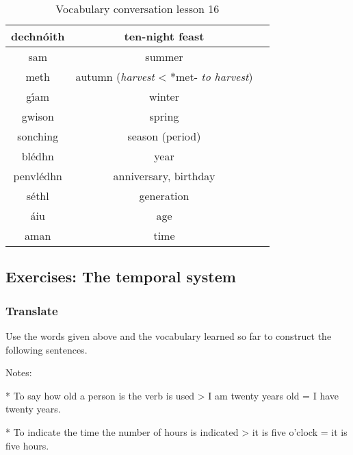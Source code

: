 \begin{table}[H]
\begin{tabular}{ccc}
  dechn\'{o}ith & ten-night feast & \\
  \midrule
  sam & summer & \\
  meth & autumn (\textit{harvest} < *met- \textit{to harvest})\\
  g\'{\i}am & winter & \\
  gwison & spring & \\
  \midrule
  sonching & season (period) & \\
  bl\'{e}dhn & year & \\
  penvl\'{e}dhn & anniversary, birthday & \\
  \midrule
  s\'{e}thl & generation & \\
  \'{a}iu & age & \\
  aman & time & \\
  \bottomrule
\end{tabular}
\label{vocab_conversation_lesson16}
\caption{Vocabulary conversation lesson 16}
\end{table}

\subsection{Exercises: The temporal system}

\subsubsection{Translate}

Use the words given above and the vocabulary learned so far to construct the following sentences.

Notes: 

* To say how old a person is the verb  is used
> I am twenty years old = I have twenty years.

* To indicate the time the number of hours is indicated
> it is five o’clock = it is five hours.

